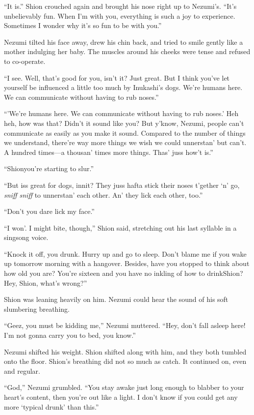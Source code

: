 ``It is.'' Shion crouched again and brought his nose right up to
Nezumi's. ``It's unbelievably fun. When I'm with you, everything is such
a joy to experience. Sometimes I wonder why it's so fun to be with
you.''

Nezumi tilted his face away, drew his chin back, and tried to smile
gently like a mother indulging her baby. The muscles around his cheeks
were tense and refused to co-operate.

``I see. Well, that's good for you, isn't it? Just great. But I think
you've let yourself be influenced a little too much by Inukashi's dogs.
We're humans here. We can communicate without having to rub noses.''

``'We're humans here. We can communicate without having to rub noses.'
Heh heh, how was that? Didn't it sound like you? But y'know, Nezumi,
people can't communicate as easily as you make it sound. Compared to the
number of things we understand, there're way more things we wish we
could unnerstan' but can't. A hundred times---a thousan' times more
things. Thas' juss how't is.''

``Shion\el you're starting to slur.''

``But iss great for dogs, innit? They juss hafta stick their noses
t'gether `n' go, \emph{sniff sniff} to unnerstan' each other. An' they lick
each other, too.''

``Don't you dare lick my face.''

``I won'. I might bite, though,'' Shion said, stretching out his last
syllable in a singsong voice.

``Knock it off, you drunk. Hurry up and go to sleep. Don't blame me if
you wake up tomorrow morning with a hangover. Besides, have you stopped
to think about how old you are? You're sixteen and you have no inkling
of how to drink\el Shion? Hey, Shion, what's wrong?''

Shion was leaning heavily on him. Nezumi could hear the sound of his
soft slumbering breathing.

``Geez, you must be kidding me,'' Nezumi muttered. ``Hey, don't fall
asleep here! I'm not gonna carry you to bed, you know.''

Nezumi shifted his weight. Shion shifted along with him, and they both
tumbled onto the floor. Shion's breathing did not so much as catch. It
continued on, even and regular.

``God,'' Nezumi grumbled. ``You stay awake just long enough to blabber
to your heart's content, then you're out like a light. I don't know if
you could get any more `typical drunk' than this.''

